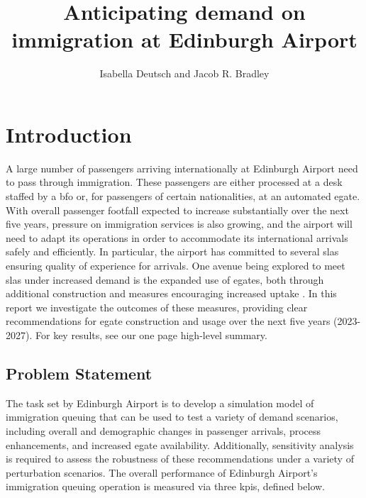 \documentclass[10pt]{article}
\title{Anticipating demand on immigration at Edinburgh Airport}
\author{Isabella Deutsch and Jacob R. Bradley}
\date{}
\begin{document}
\maketitle

\section{Introduction}

A large number of passengers arriving internationally at Edinburgh Airport need to pass through immigration. These passengers are either processed at a desk staffed by a \gls{bfo} or, for passengers of certain nationalities, at an automated \gls{egate}. With overall passenger footfall expected to increase substantially over the next five years, pressure on immigration services is also growing, and the airport will need to adapt its operations in order to accommodate its international arrivals safely and efficiently. In particular, the airport has committed to several \glspl{sla} ensuring quality of experience for arrivals. One avenue being explored to meet \glspl{sla} under increased demand is the expanded use of \glspl{egate}, both through additional construction and measures encouraging increased uptake \cite{UK_border_2025}. In this report we investigate the outcomes of these measures, providing clear recommendations for \gls{egate} construction and usage over the next five years (2023-2027). For key results, see our one page high-level summary.

\subsection{Problem Statement}
The task set by Edinburgh Airport is to develop a simulation model of immigration queuing that can be used to test a variety of demand scenarios, including overall and demographic changes in passenger arrivals, process enhancements, and increased \gls{egate} availability. 
Additionally, sensitivity analysis is required to assess the robustness of these recommendations under a variety of perturbation scenarios.
The overall performance of Edinburgh Airport's immigration queuing operation is measured via three \glspl{kpi}, defined below.
\end{document}
